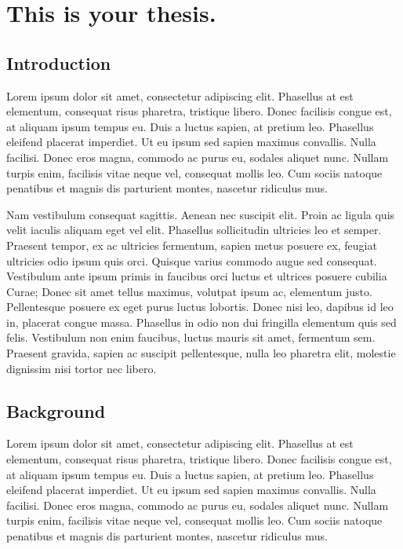 \documentclass[12pt,oneside]{report}
\begin{document}

\cartocandlists


\chapter{This is your thesis.}

\section{Introduction}
Lorem ipsum dolor sit amet, consectetur adipiscing elit. Phasellus at est
elementum, consequat risus pharetra, tristique libero. Donec facilisis congue
est, at aliquam ipsum tempus eu. Duis a luctus sapien, at pretium leo. Phasellus
eleifend placerat imperdiet. Ut eu ipsum sed sapien maximus convallis. Nulla
facilisi. Donec eros magna, commodo ac purus eu, sodales aliquet nunc. Nullam
turpis enim, facilisis vitae neque vel, consequat mollis leo. Cum sociis natoque
penatibus et magnis dis parturient montes, nascetur ridiculus mus.

Nam vestibulum consequat sagittis. Aenean nec suscipit elit. Proin ac ligula
quis velit iaculis aliquam eget vel elit. Phasellus sollicitudin ultricies leo
et semper. Praesent tempor, ex ac ultricies fermentum, sapien metus posuere ex,
feugiat ultricies odio ipsum quis orci. Quisque varius commodo augue sed
consequat. Vestibulum ante ipsum primis in faucibus orci luctus et ultrices
posuere cubilia Curae; Donec sit amet tellus maximus, volutpat ipsum ac,
elementum justo. Pellentesque posuere ex eget purus luctus lobortis. Donec nisi
leo, dapibus id leo in, placerat congue massa. Phasellus in odio non dui
fringilla elementum quis sed felis. Vestibulum non enim faucibus, luctus mauris
sit amet, fermentum sem. Praesent gravida, sapien ac suscipit pellentesque,
nulla leo pharetra elit, molestie dignissim nisi tortor nec libero.

\section{Background}
Lorem ipsum dolor sit amet, consectetur adipiscing elit. Phasellus at est
elementum, consequat risus pharetra, tristique libero. Donec facilisis congue
est, at aliquam ipsum tempus eu. Duis a luctus sapien, at pretium leo. Phasellus
eleifend placerat imperdiet. Ut eu ipsum sed sapien maximus convallis. Nulla
facilisi. Donec eros magna, commodo ac purus eu, sodales aliquet nunc. Nullam
turpis enim, facilisis vitae neque vel, consequat mollis leo. Cum sociis natoque
penatibus et magnis dis parturient montes, nascetur ridiculus mus.
\end{document}
